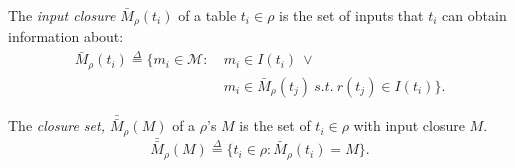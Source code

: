 


\begin{definition} The {\em input closure $\bar{M}_\rho(t_i)$} of a table $t_i \in \rho$ is the set of inputs that $t_i$ can obtain information about:
\begin{equation*}
\begin{split}
\bar{M}_\rho(t_i) \overset{\Delta}{=} \{m_i \in \mathcal{M} :\ &m_i \in I(t_i)\ \vee\\ &m_i \in \bar{M}_\rho(t_j)\ s.t.\ r(t_j) \in I(t_i)\}.
\end{split}
\end{equation*}
\end{definition}

\begin{definition} The {\em closure set, $\bar{\bar{M}}_\rho(M)$} of a $\rho$'s $M$ is the set of $t_i \in \rho$ with input closure $M$.
\begin{equation*}
\bar{\bar{M}}_\rho(M) \overset{\Delta}{=} \{t_i \in \rho : \bar{M}_\rho(t_i) = M\}. 
\end{equation*}
\end{definition}

